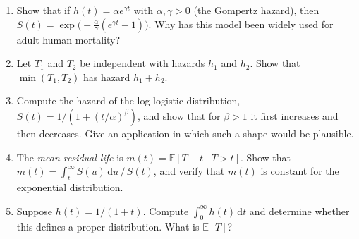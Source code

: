 \documentclass[11pt]{article}
\theoremstyle{definition}
\theoremstyle{plain}
\newcommand{\E}{\mathbb{E}}
\newcommand{\dd}{\,\mathrm{d}}
\begin{document}
\begin{enumerate}
  \item Show that if $h(t) = \alpha e^{\gamma t}$ with $\alpha, \gamma > 0$ (the Gompertz hazard), then $S(t) = \exp\bigl(-\tfrac{\alpha}{\gamma}(e^{\gamma t} - 1)\bigr)$. Why has this model been widely used for adult human mortality?
  \item Let $T_1$ and $T_2$ be independent with hazards $h_1$ and $h_2$. Show that $\min(T_1, T_2)$ has hazard $h_1 + h_2$.
  \item Compute the hazard of the log-logistic distribution, $S(t) = 1/(1 + (t/\alpha)^\beta)$, and show that for $\beta > 1$ it first increases and then decreases. Give an application in which such a shape would be plausible.
  \item The \emph{mean residual life} is $m(t) = \E[T - t \mid T > t]$. Show that $m(t) = \int_t^\infty S(u)\dd u \,/\, S(t)$, and verify that $m(t)$ is constant for the exponential distribution.
  \item Suppose $h(t) = 1/(1 + t)$. Compute $\int_0^\infty h(t)\dd t$ and determine whether this defines a proper distribution. What is $\E[T]$?
\end{enumerate}
\end{document}
